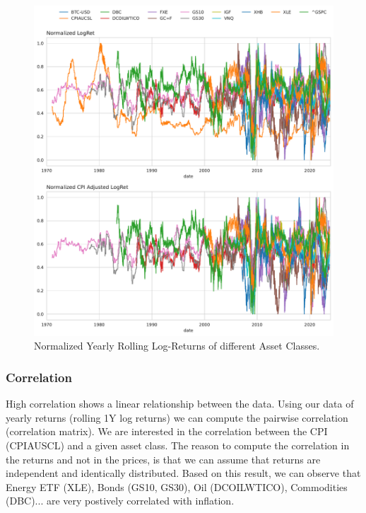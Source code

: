 \documentclass{article}
\begin{document}
\begin{figure}
    \centering
    \includegraphics[width=1\textwidth]{figure/Normalized_Returns.pdf}
    \caption{Normalized Yearly Rolling Log-Returns of different Asset Classes.}
    \label{fig:mesh2}
\end{figure}



\subsubsection*{Correlation}

High correlation shows a linear relationship between the data. Using our data of yearly returns (rolling 1Y log returns) we can compute the pairwise correlation (correlation matrix). We are interested in the correlation between the CPI (CPIAUSCL) and a given asset class. The reason to compute the correlation in the returns and not in the prices, is that we can assume that returns are independent and identically distributed. Based on this result, we can observe that Energy ETF (XLE), Bonds (GS10, GS30), Oil (DCOILWTICO), Commodities (DBC)... are very postively correlated with inflation.
\end{document}
